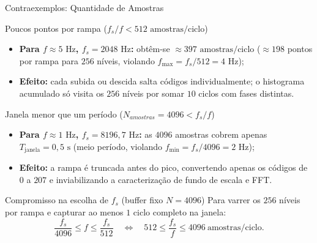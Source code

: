 \documentclass{beamer}
\begin{document}
\begin{frame}{Contraexemplos: Quantidade de Amostras}
\begin{block}{Poucos pontos por rampa ($f_s / f < 512\text{ amostras/ciclo}$)}
\footnotesize
\begin{itemize}
\item \textbf{Para $f \approx 5\text{ Hz}$, $f_s = 2048\text{ Hz}$:} obtêm-se $\approx 397\text{ amostras/ciclo}$ ($\approx 198$ pontos por rampa para $256$ níveis, violando $f_{\max} = f_s/512 = 4\text{ Hz}$);
\item \textbf{Efeito:} cada subida ou descida salta códigos individualmente; o histograma acumulado só visita os $256$ níveis por somar $10$ ciclos com fases distintas.
\end{itemize}
\end{block}
\vspace{-0.08cm}
\begin{block}{Janela menor que um período ($N_{amostras} = 4096 < f_s / f$)}
\footnotesize
\begin{itemize}
\item \textbf{Para $f \approx 1\text{ Hz}$, $f_s = 8196{,}7\text{ Hz}$:} as $4096$ amostras cobrem apenas $T_{\text{janela}} = 0{,}5\text{ s}$ (meio período, violando $f_{\min} = f_s/4096 = 2\text{ Hz}$);
\item \textbf{Efeito:} a rampa é truncada antes do pico, convertendo apenas os códigos de $0$ a $207$ e inviabilizando a caracterização de fundo de escala e FFT.
\end{itemize}
\end{block}
\vspace{-0.08cm}
\begin{exampleblock}{Compromisso na escolha de $f_s$ (buffer fixo $N = 4096$)}
\footnotesize
Para varrer os $256$ níveis por rampa e capturar ao menos $1$ ciclo completo na janela:
\vspace{-0.18cm}
\[
\frac{f_s}{4096} \le f \le \frac{f_s}{512} \quad\Longleftrightarrow\quad \boxed{512 \le \frac{f_s}{f} \le 4096\ \text{amostras/ciclo}}.
\]
\vspace{-0.28cm}
\end{exampleblock}
\end{frame}
\end{document}
